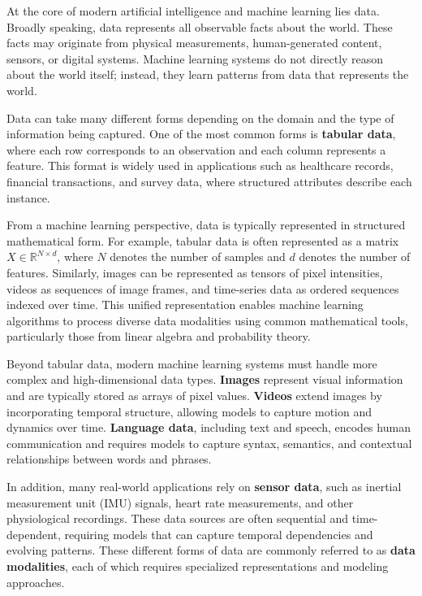 \documentclass{article}
\begin{document}
At the core of modern artificial intelligence and machine learning lies data. Broadly speaking, data represents all observable facts about the world. These facts may originate from physical measurements, human-generated content, sensors, or digital systems. Machine learning systems do not directly reason about the world itself; instead, they learn patterns from data that represents the world.

Data can take many different forms depending on the domain and the type of information being captured. One of the most common forms is \textbf{tabular data}, where each row corresponds to an observation and each column represents a feature. This format is widely used in applications such as healthcare records, financial transactions, and survey data, where structured attributes describe each instance.

From a machine learning perspective, data is typically represented in structured mathematical form. For example, tabular data is often represented as a matrix $X \in \mathbb{R}^{N \times d}$, where $N$ denotes the number of samples and $d$ denotes the number of features. Similarly, images can be represented as tensors of pixel intensities, videos as sequences of image frames, and time-series data as ordered sequences indexed over time. This unified representation enables machine learning algorithms to process diverse data modalities using common mathematical tools, particularly those from linear algebra and probability theory.

Beyond tabular data, modern machine learning systems must handle more complex and high-dimensional data types. \textbf{Images} represent visual information and are typically stored as arrays of pixel values. \textbf{Videos} extend images by incorporating temporal structure, allowing models to capture motion and dynamics over time. \textbf{Language data}, including text and speech, encodes human communication and requires models to capture syntax, semantics, and contextual relationships between words and phrases.

In addition, many real-world applications rely on \textbf{sensor data}, such as inertial measurement unit (IMU) signals, heart rate measurements, and other physiological recordings. These data sources are often sequential and time-dependent, requiring models that can capture temporal dependencies and evolving patterns. These different forms of data are commonly referred to as \textbf{data modalities}, 
each of which requires specialized representations and modeling approaches.
\end{document}

